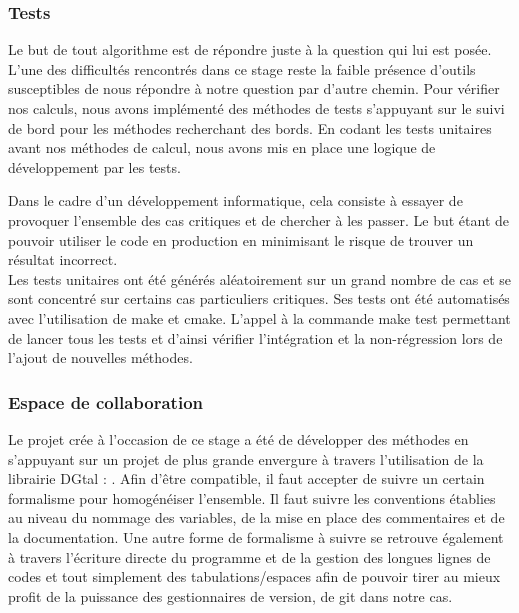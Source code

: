 \subsubsection{Tests}

Le but de tout algorithme est de répondre juste à la question qui lui est posée. L'une des difficultés rencontrés dans ce stage reste la faible présence d'outils susceptibles de nous répondre à notre question par d'autre chemin. Pour vérifier nos calculs, nous avons implémenté des méthodes de tests s'appuyant sur le suivi de bord pour les méthodes recherchant des bords. En codant les tests unitaires avant nos méthodes de calcul, nous avons mis en place une logique de développement par les tests. 

Dans le cadre d'un développement informatique, cela consiste à essayer de provoquer l'ensemble des cas critiques et de chercher à les passer. Le but étant de pouvoir utiliser le code en production en minimisant le risque de trouver un résultat incorrect.\\

Les tests unitaires ont été générés aléatoirement sur un grand nombre de cas et se sont concentré sur certains cas particuliers critiques. Ses tests ont été automatisés avec l'utilisation de make et cmake. L'appel à la commande make test permettant de lancer tous les tests et d'ainsi vérifier l'intégration et la non-régression lors de l'ajout de nouvelles méthodes. 


\subsubsection{Espace de collaboration}

Le projet crée à l'occasion de ce stage a été de développer des méthodes en s'appuyant sur un projet de plus grande envergure à travers l'utilisation de la librairie DGtal : \cite{DGtal}. Afin d'être compatible, il faut accepter de suivre un certain formalisme pour homogénéiser l'ensemble. Il faut suivre les conventions établies au niveau du nommage des variables, de la mise en place des commentaires et de la documentation. Une autre forme de formalisme à suivre se retrouve également à travers l'écriture directe du programme et de la gestion des longues lignes de codes et tout simplement des tabulations/espaces afin de pouvoir tirer au mieux profit de la puissance des gestionnaires de version, de git dans notre cas.\\

